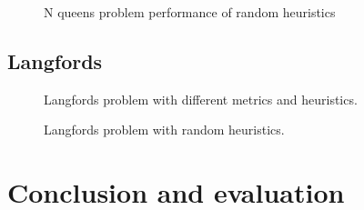\documentclass{article}
\begin{document}
\begin{figure}[H]
\centering
{}
\caption{N queens problem performance of random heuristics}
\end{figure}



\subsection{Langfords}
\begin{figure}[H]
\centering
{}
\caption{Langfords problem with different metrics and heuristics.}
\end{figure}

\begin{figure}[H]
\centering
{}
\caption{Langfords problem with random heuristics.}
\end{figure}



\section{Conclusion and evaluation}

\printbibliography
\end{document}
